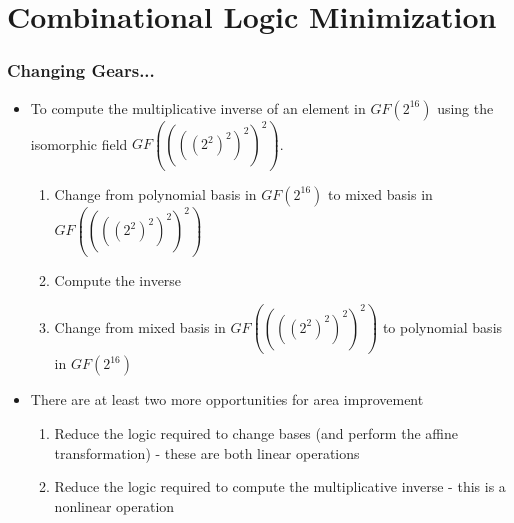 \documentclass[10pt]{beamer}
\begin{document}


\section{Combinational Logic Minimization}
\begin{frame}
	\frametitle{Changing Gears...}
	\begin{itemize}
		\item To compute the multiplicative inverse of an element in $GF(2^{16})$ using the isomorphic field $GF((((2^2)^2)^2)^2)$.
		\begin{enumerate}
			\item Change from polynomial basis in $GF(2^{16})$ to mixed basis in $GF((((2^2)^2)^2)^2)$
			\item Compute the inverse
			\item Change from mixed basis in $GF((((2^2)^2)^2)^2)$ to polynomial basis in $GF(2^{16})$
		\end{enumerate}
		\pause
		\item There are at least two more opportunities for area improvement
		\begin{enumerate}
			\item Reduce the logic required to change bases (and perform the affine transformation) - these are both linear operations
			\item Reduce the logic required to compute the multiplicative inverse - this is a nonlinear operation
		\end{enumerate}
	\end{itemize}
\end{frame}
\end{document}
